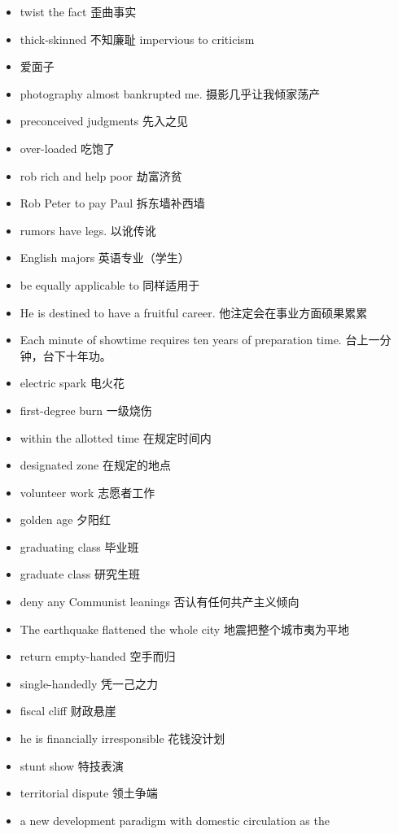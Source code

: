 \documentclass{ctexart}
\begin{document}
\begin{enumerate}
\begin{itemize}
      \item twist the fact 歪曲事实
      \item thick-skinned 不知廉耻 impervious to criticism
      \item  爱面子
      \item photography almost bankrupted me. 摄影几乎让我倾家荡产
      \item preconceived judgments 先入之见
      \item over-loaded 吃饱了
      \item rob rich and help poor 劫富济贫
      \item Rob Peter to pay Paul 拆东墙补西墙
      \item rumors have legs. 以讹传讹
      \item English majors 英语专业（学生）
      \item be equally applicable to 同样适用于
      \item He is destined to have a fruitful career. 他注定会在事业方面硕果累累
      \item  Each minute of showtime requires ten years of preparation time. 台上一分钟，台下十年功。
      \item electric spark 电火花
      \item first-degree burn 一级烧伤
      \item within the allotted time 在规定时间内
      \item designated zone 在规定的地点
      \item volunteer work 志愿者工作
      \item golden age 夕阳红
      \item graduating class 毕业班
      \item graduate class 研究生班
      \item deny any Communist leanings 否认有任何共产主义倾向
      \item The earthquake flattened the whole city 地震把整个城市夷为平地
      \item return empty-handed 空手而归
      \item single-handedly 凭一己之力
      \item fiscal cliff 财政悬崖
      \item he is financially irresponsible 花钱没计划
      \item stunt show 特技表演
      \item territorial dispute 领土争端
      \item a new development paradigm with domestic circulation as the

\end{itemize}
\end{enumerate}
\end{document}
